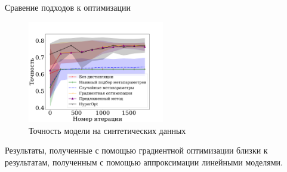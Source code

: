\documentclass[12pt, aspectratio=169]{beamer}
\begin{document}

\begin{frame}{Сравение подходов к оптимизации}
\begin{figure}
    \caption*{Точность модели на синтетических данных}
    \vspace{-1 cm}
    \includegraphics[width=0.53\textwidth]{synth_accuracy_rus.pdf}
\end{figure}
Результаты, полученные с помощью градиентной оптимизации близки к результатам, полученным с помощью аппроксимации линейными моделями.
\end{frame}


\end{document}
